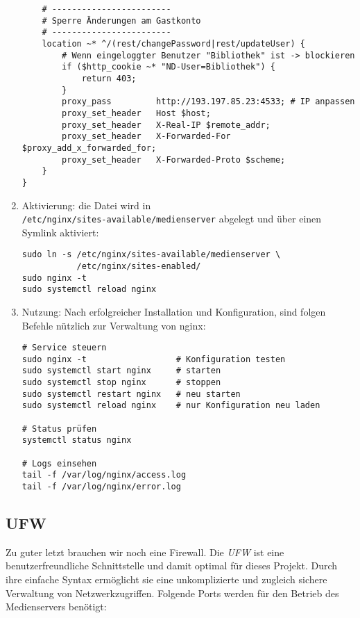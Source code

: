 \documentclass[12pt,a4paper]{report}
\begin{document}
\begin{enumerate}
\begin{verbatim}
    # ------------------------
    # Sperre Änderungen am Gastkonto
    # ------------------------
    location ~* ^/(rest/changePassword|rest/updateUser) {
        # Wenn eingeloggter Benutzer "Bibliothek" ist -> blockieren
        if ($http_cookie ~* "ND-User=Bibliothek") {
            return 403;
        }
        proxy_pass         http://193.197.85.23:4533; # IP anpassen
        proxy_set_header   Host $host;
        proxy_set_header   X-Real-IP $remote_addr;
        proxy_set_header   X-Forwarded-For $proxy_add_x_forwarded_for;
        proxy_set_header   X-Forwarded-Proto $scheme;
    }
}
    \end{verbatim}  

    \item Aktivierung:
    die Datei wird in\\ \texttt{/etc/nginx/sites-available/medienserver} abgelegt 
    und über einen Symlink aktiviert:  
    \begin{verbatim}
sudo ln -s /etc/nginx/sites-available/medienserver \
           /etc/nginx/sites-enabled/
sudo nginx -t
sudo systemctl reload nginx
    \end{verbatim}  

    \item Nutzung:
    Nach erfolgreicher Installation und Konfiguration, sind folgen Befehle nützlich zur Verwaltung von nginx:
    \begin{verbatim}
# Service steuern
sudo nginx -t                  # Konfiguration testen
sudo systemctl start nginx     # starten
sudo systemctl stop nginx      # stoppen
sudo systemctl restart nginx   # neu starten
sudo systemctl reload nginx    # nur Konfiguration neu laden

# Status prüfen
systemctl status nginx

# Logs einsehen
tail -f /var/log/nginx/access.log
tail -f /var/log/nginx/error.log
    \end{verbatim}
  \end{enumerate}


  \subsection{UFW}
  Zu guter letzt brauchen wir noch eine Firewall. 
  Die \emph{\ac{UFW}} ist eine benutzerfreundliche Schnittstelle und damit optimal für dieses Projekt. 
  Durch ihre einfache Syntax ermöglicht sie eine unkomplizierte und zugleich sichere Verwaltung von Netzwerkzugriffen. 
  Folgende Ports werden für den Betrieb des Medienservers benötigt:
   
\end{document}
